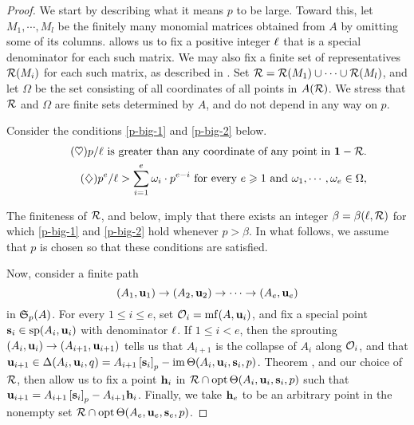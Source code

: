 \documentclass[11pt]{amsart}
\begin{document}
\begin{proof}  We start by describing what it means $p$ to be large.  Toward this, let $M_1, \cdots, M_l$ be the finitely many monomial matrices obtained from $A$ by omitting some of its columns.   allows us to fix a positive integer $\ell$ that is a special denominator for each such matrix.  We may also fix a finite set of representatives $\mathcal{R}(M_i)$ for each such matrix, as described in .  Set $\mathcal{R} = \mathcal{R}(M_1) \cup \cdots \cup \mathcal{R}(M_l)$, and let $\Omega$ be the set consisting of all coordinates of all points in $A(\mathcal{R})$.  We stress that $\mathcal{R}$ and $\Omega$ are finite sets determined by $A$, and do not depend in any way on $p$.  

Consider the conditions \eqref{p-big-1} and \eqref{p-big-2} below.  
%
\begin{align}
\tag{$\heartsuit$} \label{p-big-1}
\text{$p/\ell$ is greater than any coordinate of any point in $\mathbf{1} - \mathcal{R}$.} \\ 
 \label{p-big-2}
\tag{$\diamondsuit$}\text{$p^e / \ell > \sum_{i=1}^e \omega_i \cdot p^{e-i}$ for every $e \geqslant 1$ and $\omega_1, \cdots, \omega_e \in \Omega$,}
\end{align}

The finiteness of $\mathcal{R}$,  and  below, imply that there exists an integer $\beta = \beta(\ell, \mathcal{R})$ for which \eqref{p-big-1} and \eqref{p-big-2} hold whenever $p > \beta$.  In what follows, we assume that $p$ is chosen so that these conditions are satisfied.

Now, consider a finite path \[ (A_1, \mathbf{u}_1) \to (A_2, \mathbf{u}_2) \to \cdots \to (A_e, \mathbf{u}_e) \] in $\mathfrak{S}_p(A)$.  For every $1 \leq i \leq e$, set $\mathcal{O}_i = \operatorname{mf}(A, \mathbf{u}_i)$, and fix a special point $\mathbf{s}_i \in \operatorname{sp}(A_i, \mathbf{u}_i)$ with denominator $\ell$.  If $1 \leq i < e$, then the sprouting $(A_i, \mathbf{u}_i) \to (A_{i+1}, \mathbf{u}_{i+1})$ tells us that $A_{i+1}$ is the collapse of $A_i$ along $\mathcal{O}_i$, and that $\mathbf{u}_{i+1} \in \Delta(A_i, \mathbf{u}_i, q) = A_{i+1} \left[ \mathbf{s}_i \right]_p - \operatorname{im}  \Theta( A_i, \mathbf{u}_i, \mathbf{s}_i, p)$.  Theorem , and our choice of $\mathcal{R}$, then allow us to fix a point $\mathbf{h}_i$ in $\mathcal{R} \cap \operatorname{opt} \Theta ( A_i, \mathbf{u}_i, \mathbf{s}_i, p)$ such that 
$\mathbf{u}_{i+1} = A_{i+1} \left[ \mathbf{s}_i \right]_p - A_{i+1} \mathbf{h}_i$.  Finally, we take $\mathbf{h}_e$ to be an arbitrary point in the nonempty set $\mathcal{R} \cap \operatorname{opt} \Theta ( A_e, \mathbf{u}_e, \mathbf{s}_e, p)$.



\end{proof}
\end{document}

